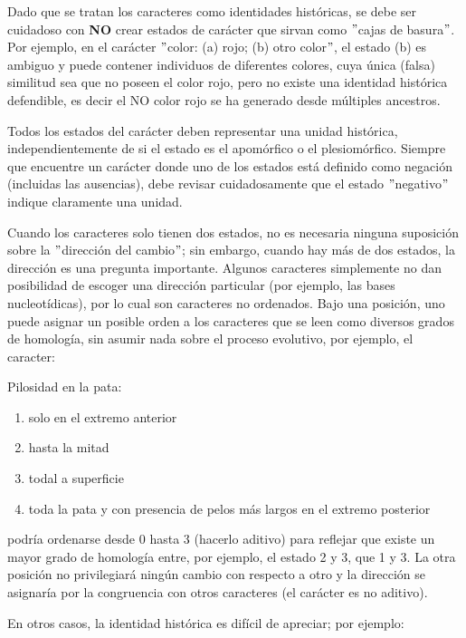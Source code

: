 Dado que se tratan los caracteres como identidades hist\'oricas, se debe ser cuidadoso con \textbf{NO} crear estados de car\'acter que sirvan como $"$cajas de basura$"$. Por ejemplo, en el car\'acter $"$color: (a) rojo; (b) otro color$"$, el estado (b) es ambiguo y puede contener individuos de diferentes colores, cuya \'unica (falsa) similitud sea que no poseen el color rojo, pero no existe una identidad hist\'orica defendible, es decir el NO color rojo se ha generado desde m\'ultiples ancestros.


Todos los estados del car\'acter deben representar una unidad hist\'orica, independientemente de si el estado es el apom\'orfico o el 
plesiom\'orfico. 
Siempre que encuentre un car\'acter donde uno de los estados est\'a definido como negaci\'on (incluidas las ausencias), 
debe revisar cuidadosamente que el estado $"$negativo$"$ indique claramente una unidad.


Cuando los caracteres solo tienen dos estados, no es necesaria ninguna suposici\'on sobre la $"$direcci\'on del cambio$"$; 
sin embargo, cuando hay m\'as de dos estados, la direcci\'on es una pregunta importante. 
Algunos caracteres simplemente no dan posibilidad de escoger una direcci\'on particular (por ejemplo, las bases nucleot\'idicas), 
por lo cual son caracteres no ordenados. 
Bajo una posici\'on,  uno puede asignar un posible orden a los caracteres que se leen como diversos grados de homolog\'ia, 
sin asumir nada sobre el proceso evolutivo, 
por ejemplo, el caracter: 

\begin{small}
Pilosidad en la pata: 
\begin{enumerate}[start=0]
\item solo en el extremo anterior
\item hasta la mitad
\item todal a superficie
\item toda la pata y con presencia de pelos m\'as largos en el extremo posterior
\end{enumerate}	
\end{small}

podr\'ia ordenarse desde 0 hasta 3 (hacerlo aditivo) para reflejar que existe un mayor grado de homolog\'ia entre, por ejemplo, el estado 2 y 3, que 1 y 3. 
La otra posici\'on no privilegiar\'a ning\'un cambio con respecto a otro y la direcci\'on se asignar\'ia por la congruencia con otros caracteres (el car\'acter es no aditivo).


En otros casos, la identidad hist\'orica es dif\'icil de apreciar; por ejemplo:

